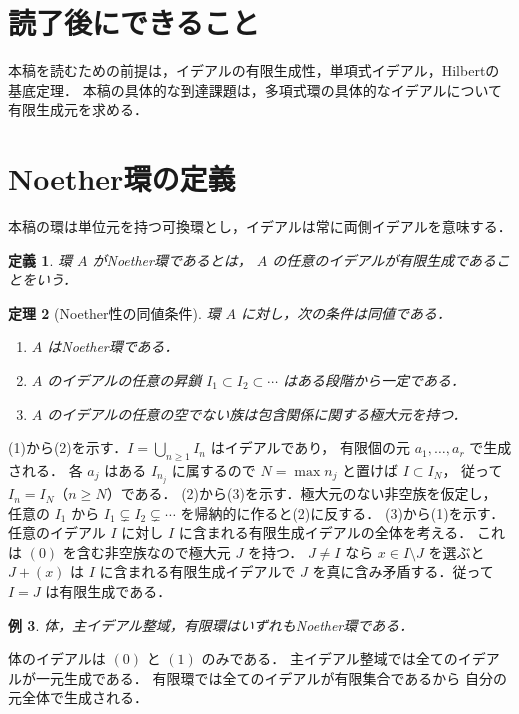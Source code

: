 \documentclass[a5paper,10pt,onecolumn]{jsarticle}
\makeatletter
\theoremstyle{mathnotetheorem}
\newtheorem{theorem}{定理}[section]
\newtheorem{definition}[theorem]{定義}
\newtheorem{example}[theorem]{例}
\renewcommand{\proofname}{証明}
\renewenvironment{proof}[1][\proofname]{%
  \par\pushQED{\qed}\normalfont\topsep4\p@\@plus2\p@\relax
  \trivlist\item[\hskip\labelsep\bfseries #1]\ignorespaces
}{\popQED\endtrivlist\@endpefalse}
\makeatother
\begin{document}
\section*{読了後にできること}
本稿を読むための前提は，イデアルの有限生成性，単項式イデアル，Hilbertの基底定理．
本稿の具体的な到達課題は，多項式環の具体的なイデアルについて有限生成元を求める．

\section{Noether環の定義}
本稿の環は単位元を持つ可換環とし，イデアルは常に両側イデアルを意味する．
\begin{definition}
環 $A$ がNoether環であるとは，
$A$ の任意のイデアルが有限生成であることをいう．
\end{definition}
\begin{theorem}[Noether性の同値条件]\label{thm:acc}
環 $A$ に対し，次の条件は同値である．
\begin{enumerate}
\item $A$ はNoether環である．
\item $A$ のイデアルの任意の昇鎖
 $I_1\subset I_2\subset\cdots$ はある段階から一定である．
\item $A$ のイデアルの任意の空でない族は包含関係に関する極大元を持つ．
\end{enumerate}
\end{theorem}
\begin{proof}
(1)から(2)を示す．$I=\bigcup_{n\ge1}I_n$ はイデアルであり，
有限個の元 $a_1,\ldots,a_r$ で生成される．
各 $a_j$ はある $I_{n_j}$ に属するので
$N=\max n_j$ と置けば $I\subset I_N$，
従って $I_n=I_N$（$n\ge N$）である．
(2)から(3)を示す．極大元のない非空族を仮定し，
任意の $I_1$ から $I_1\subsetneq I_2\subsetneq\cdots$
を帰納的に作ると(2)に反する．
(3)から(1)を示す．任意のイデアル $I$ に対し
$I$ に含まれる有限生成イデアルの全体を考える．
これは $(0)$ を含む非空族なので極大元 $J$ を持つ．
$J\ne I$ なら $x\in I\setminus J$ を選ぶと
$J+(x)$ は $I$ に含まれる有限生成イデアルで
$J$ を真に含み矛盾する．従って $I=J$ は有限生成である．
\end{proof}
\begin{example}
体，主イデアル整域，有限環はいずれもNoether環である．
\end{example}
\begin{proof}
体のイデアルは $(0)$ と $(1)$ のみである．
主イデアル整域では全てのイデアルが一元生成である．
有限環では全てのイデアルが有限集合であるから
自分の元全体で生成される．
\end{proof}
\end{document}
